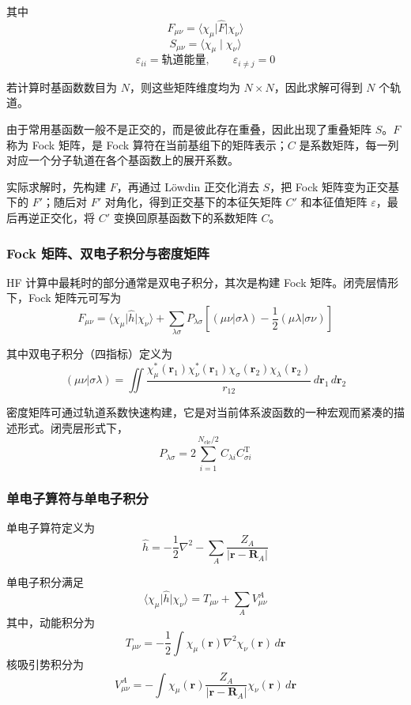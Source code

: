 其中
\[
F_{\mu\nu}=\langle \chi_\mu \lvert \hat F \rvert \chi_\nu \rangle
\]
\[
S_{\mu\nu}=\langle \chi_\mu \mid \chi_\nu \rangle
\]
\[
\varepsilon_{ii}=\text{轨道能量},\qquad \varepsilon_{i\neq j}=0
\]

若计算时基函数数目为 $N$，则这些矩阵维度均为 $N\times N$，因此求解可得到 $N$ 个轨道。

由于常用基函数一般不是正交的，而是彼此存在重叠，因此出现了重叠矩阵 $S$。$F$ 称为 Fock 矩阵，是 Fock 算符在当前基组下的矩阵表示；$C$ 是系数矩阵，每一列对应一个分子轨道在各个基函数上的展开系数。

实际求解时，先构建 $F$，再通过 Löwdin 正交化消去 $S$，把 Fock 矩阵变为正交基下的 $F'$；随后对 $F'$ 对角化，得到正交基下的本征矢矩阵 $C'$ 和本征值矩阵 $\varepsilon$，最后再逆正交化，将 $C'$ 变换回原基函数下的系数矩阵 $C$。

\subsubsection*{Fock 矩阵、双电子积分与密度矩阵}

HF 计算中最耗时的部分通常是双电子积分，其次是构建 Fock 矩阵。闭壳层情形下，Fock 矩阵元可写为
\[
F_{\mu\nu}
=
\langle \chi_\mu \lvert \hat h \rvert \chi_\nu \rangle
+
\sum_{\lambda\sigma} P_{\lambda\sigma}
\left[
(\mu\nu\vert \sigma\lambda)-\frac{1}{2}(\mu\lambda\vert \sigma\nu)
\right]
\]

其中双电子积分（四指标）定义为
\[
(\mu\nu\vert \sigma\lambda)
=
\iint
\frac{\chi_\mu^*(\mathbf r_1)\chi_\nu^*(\mathbf r_1)\chi_\sigma(\mathbf r_2)\chi_\lambda(\mathbf r_2)}{r_{12}}
\,
d\mathbf r_1\,d\mathbf r_2
\]

密度矩阵可通过轨道系数快速构建，它是对当前体系波函数的一种宏观而紧凑的描述形式。闭壳层形式下，
\[
P_{\lambda\sigma}
=
2\sum_{i=1}^{N_{\mathrm{ele}}/2} C_{\lambda i}C_{\sigma i}^{\mathrm T}
\]

\subsubsection*{单电子算符与单电子积分}

单电子算符定义为
\[
\hat h
=
-\frac{1}{2}\nabla^2
-\sum_A \frac{Z_A}{\lvert \mathbf r-\mathbf R_A\rvert}
\]

单电子积分满足
\[
\langle \chi_\mu \lvert \hat h \rvert \chi_\nu \rangle
=
T_{\mu\nu}
+
\sum_A V_{\mu\nu}^{A}
\]
其中，动能积分为
\[
T_{\mu\nu}
=
-\frac{1}{2}\int \chi_\mu(\mathbf r)\nabla^2\chi_\nu(\mathbf r)\,d\mathbf r
\]
核吸引势积分为
\[
V_{\mu\nu}^{A}
=
-\int \chi_\mu(\mathbf r)\frac{Z_A}{\lvert \mathbf r-\mathbf R_A\rvert}\chi_\nu(\mathbf r)\,d\mathbf r
\]

